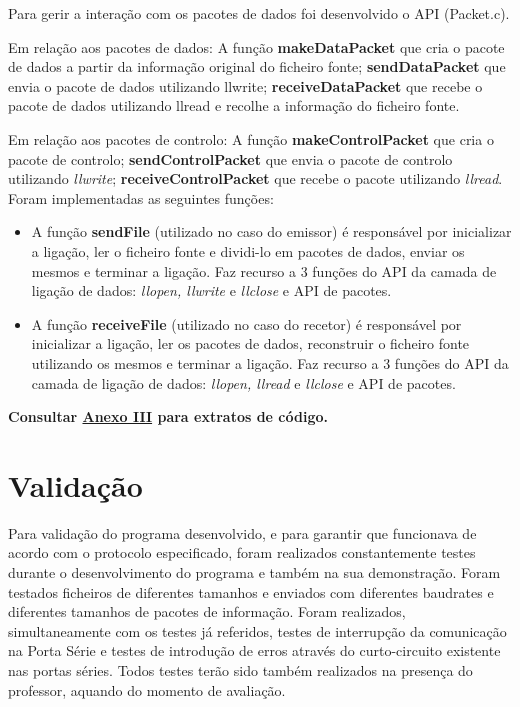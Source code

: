 \documentclass[a4paper, 11pt]{article}
\begin{document}
Para gerir a interação com os pacotes de dados foi desenvolvido o API (Packet.c).

Em relação aos pacotes de dados: 
A função \textbf{makeDataPacket} que cria o pacote de dados a partir da informação original do ficheiro fonte; \textbf{sendDataPacket} que envia o pacote de dados utilizando llwrite; \textbf{receiveDataPacket} que recebe o pacote de dados utilizando llread e recolhe a informação do ficheiro fonte.

Em relação aos pacotes de controlo:
A função \textbf{makeControlPacket} que cria o pacote de controlo; \textbf{sendControlPacket} que envia o pacote de controlo utilizando \textit{llwrite}; \textbf{receiveControlPacket} que recebe o pacote utilizando \textit{llread}.\\

Foram implementadas as seguintes funções:
\begin{itemize}
	\item A função \textbf{sendFile} (utilizado no caso do emissor) é responsável por inicializar a ligação, ler o ficheiro fonte e dividi-lo em pacotes de dados, enviar os mesmos e terminar a ligação. Faz recurso a 3 funções do API da camada de ligação de dados: \textit{llopen, llwrite} e \textit{llclose} e API de pacotes.
	\item A função \textbf{receiveFile} (utilizado no caso do recetor) é responsável por inicializar a ligação, ler os pacotes de dados, reconstruir o ficheiro fonte utilizando os mesmos e terminar a ligação. Faz recurso a 3 funções do API da camada de ligação de dados: \textit{llopen, llread} e \textit{llclose} e API de pacotes.
\end{itemize}

\textbf{Consultar \underline{Anexo III} para extratos de código.}

\section{Validação}

Para validação do programa desenvolvido, e para garantir que funcionava de acordo com o protocolo especificado, foram realizados constantemente testes durante o desenvolvimento do programa e também na sua demonstração. Foram testados ficheiros de diferentes tamanhos e enviados com diferentes baudrates e diferentes tamanhos de pacotes de informação. Foram realizados, simultaneamente com os testes já referidos, testes de interrupção da comunicação na Porta Série e testes de introdução de erros através do curto-circuito existente nas portas séries. Todos testes terão sido também realizados na presença do professor, aquando do momento de avaliação.
\end{document}
